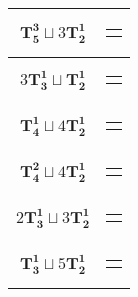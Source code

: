 \documentclass{article}
\begin{document}
{\begin{longtable}{|c|c|}
    $\mathbf{T_{5}^{3}} \sqcup 3\mathbf{T_{2}^{1}}$ & \begin{tabular}{@{}l@{}} $(3,0,4,5,6)\sqcup(8,1)\sqcup(10,11)\sqcup(9,7)$ \end{tabular} \\ \hline
    $3\mathbf{T_{3}^{1}} \sqcup \mathbf{T_{2}^{1}}$ & \begin{tabular}{@{}l@{}} $(0,6,1)\sqcup(4,8,5)\sqcup(2,9,7)\sqcup(10,11)$ \end{tabular} \\ \hline
    $\mathbf{T_{4}^{1}} \sqcup 4\mathbf{T_{2}^{1}}$ & \begin{tabular}{@{}l@{}} $(0,6,1,5)\sqcup(9,2)\sqcup(8,10)\sqcup(4,7)\sqcup(11,12)$ \end{tabular} \\ \hline
    $\mathbf{T_{4}^{2}} \sqcup 4\mathbf{T_{2}^{1}}$ & \begin{tabular}{@{}l@{}} $(4,0,5,6)\sqcup(2,3)\sqcup(9,11)\sqcup(8,1)\sqcup(10,7)$ \end{tabular} \\ \hline
    $2\mathbf{T_{3}^{1}} \sqcup 3\mathbf{T_{2}^{1}}$ & \begin{tabular}{@{}l@{}} $(0,6,1)\sqcup(4,8,5)\sqcup(10,3)\sqcup(9,7)\sqcup(11,12)$ \end{tabular} \\ \hline
    $\mathbf{T_{3}^{1}} \sqcup 5\mathbf{T_{2}^{1}}$ & \begin{tabular}{@{}l@{}} $(0,6,1)\sqcup(8,4)\sqcup(2,5)\sqcup(10,3)\sqcup(9,7)\sqcup(11,12)$ \end{tabular} \\ \hline
    \end{longtable}%
}
\label{fig:sigma plus minus}
\vspace{-4mm}
\begin{center}
\end{center}
\end{document}
